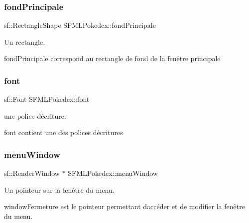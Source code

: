 \subsubsection{\texorpdfstring{fond\+Principale}{fondPrincipale}}
{\footnotesize\ttfamily sf\+::\+Rectangle\+Shape S\+F\+M\+L\+Pokedex\+::fond\+Principale\hspace{0.3cm}{\ttfamily [private]}}



Un rectangle. 

fond\+Principale correspond au rectangle de fond de la fenêtre principale \mbox{\label{class_s_f_m_l_pokedex_aacfb7ae2339b52abe0b241d7e232e6ae}} 
\subsubsection{\texorpdfstring{font}{font}}
{\footnotesize\ttfamily sf\+::\+Font S\+F\+M\+L\+Pokedex\+::font\hspace{0.3cm}{\ttfamily [private]}}



une police d\textquotesingle{}écriture. 

font contient une des polices d\textquotesingle{}écritures \mbox{\label{class_s_f_m_l_pokedex_ab1c7f0857b4d7ca6b7d908684d5bd834}} 
\subsubsection{\texorpdfstring{menu\+Window}{menuWindow}}
{\footnotesize\ttfamily sf\+::\+Render\+Window $\ast$ S\+F\+M\+L\+Pokedex\+::menu\+Window\hspace{0.3cm}{\ttfamily [private]}}



Un pointeur sur la fenêtre du menu. 

window\+Fermeture est le pointeur permettant d\textquotesingle{}accéder et de modifier la fenêtre du menu. \mbox{\label{class_s_f_m_l_pokedex_a1ef2187090948d629a72070792240799}} 
